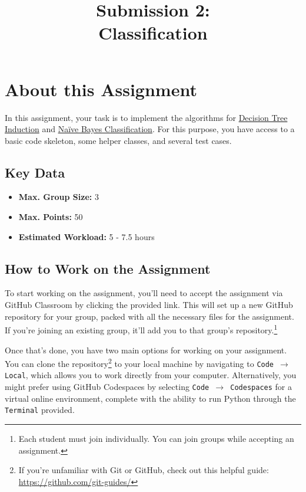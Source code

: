 \documentclass[
english,
smallborders
]{i6prcsht}
\begin{document}
\title{Submission 2: \\ Classification}
\maketitle
\vspace*{-2cm}

\section*{About this Assignment}

In this assignment, your task is to implement the algorithms for  \hyperref[sec:task-one]{Decision Tree Induction} and \hyperref[sec:task-one]{Naïve Bayes Classification}. For this purpose, you have access to a basic code skeleton, some helper classes, and several test cases.

\subsection*{Key Data}

\begin{itemize}
	\item \textbf{Max. Group Size:} 3
	\item \textbf{Max. Points:} 50
	\item \textbf{Estimated Workload:} 5 - 7.5 hours
\end{itemize}

\subsection*{How to Work on the Assignment}

To start working on the assignment, you'll need to accept the assignment via GitHub Classroom by clicking the provided link. This will set up a new GitHub repository for your group, packed with all the necessary files for the assignment. If you're joining an existing group, it'll add you to that group's repository.\footnote{Each student must join individually. You can join groups while accepting an assignment.}

Once that's done, you have two main options for working on your assignment. You can clone the repository\footnote{If you're unfamiliar with Git or GitHub, check out this helpful guide: \url{https://github.com/git-guides/}} to your local machine by navigating to \texttt{Code $\rightarrow$ Local}, which allows you to work directly from your computer. Alternatively, you might prefer using GitHub Codespaces by selecting \texttt{Code $\rightarrow$ Codespaces} for a virtual online environment, complete with the ability to run Python through the \texttt{Terminal} provided.
\end{document}
